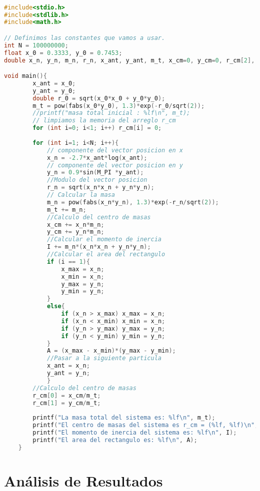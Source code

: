 \documentclass[12pt]{article}
\begin{document}
\begin{lstlisting}[language=C, caption={Calculo del area.}, style=mystyle]

#include<stdio.h>
#include<stdlib.h>
#include<math.h>

// Definimos las constantes que vamos a usar.
int N = 100000000;
float x_0 = 0.3333, y_0 = 0.7453;
double x_n, y_n, m_n, r_n, x_ant, y_ant, m_t, x_cm=0, y_cm=0, r_cm[2], I=0, x_max, x_min, y_max, y_min, A;

void main(){
        x_ant = x_0;
        y_ant = y_0;
        double r_0 = sqrt(x_0*x_0 + y_0*y_0);
        m_t = pow(fabs(x_0*y_0), 1.3)*exp(-r_0/sqrt(2));
        //printf("masa total inicial : %lf\n", m_t);
        // limpiamos la memoria del arreglo r_cm
        for (int i=0; i<1; i++) r_cm[i] = 0;
        
        for (int i=1; i<N; i++){
            // componente del vector posicion en x
            x_n = -2.7*x_ant*log(x_ant);
            // componente del vector posicion en y
            y_n = 0.9*sin(M_PI *y_ant);
            //Modulo del vector posicion
            r_n = sqrt(x_n*x_n + y_n*y_n);
            // Calcular la masa
            m_n = pow(fabs(x_n*y_n), 1.3)*exp(-r_n/sqrt(2));
            m_t += m_n;
            //Calculo del centro de masas
            x_cm += x_n*m_n;
            y_cm += y_n*m_n;
            //Calcular el momento de inercia
            I += m_n*(x_n*x_n + y_n*y_n);
            //Calcular el area del rectangulo
            if (i == 1){
                x_max = x_n;
                x_min = x_n;
                y_max = y_n;
                y_min = y_n;
            }
            else{
                if (x_n > x_max) x_max = x_n;
                if (x_n < x_min) x_min = x_n;
                if (y_n > y_max) y_max = y_n;
                if (y_n < y_min) y_min = y_n;
            }
            A = (x_max - x_min)*(y_max - y_min);  
            //Pasar a la siguiente particula
            x_ant = x_n;
            y_ant = y_n;
            }  
        //Calculo del centro de masas
        r_cm[0] = x_cm/m_t;
        r_cm[1] = y_cm/m_t;
        
        printf("La masa total del sistema es: %lf\n", m_t);
        printf("El centro de masas del sistema es r_cm = (%lf, %lf)\n", r_cm[0], r_cm[1]);
        printf("El momento de inercia del sistema es: %lf\n", I);
        printf("El area del rectangulo es: %lf\n", A);
    }
    \end{lstlisting}


\section{Análisis de Resultados}
\end{document}
